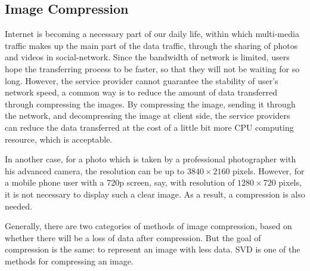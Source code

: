 \documentclass{article}
\begin{document}
        \subsection{Image Compression}
            \par
            Internet is becoming a necessary part of our daily life,
            within which multi-media traffic
            makes up the main part of the data traffic,
            through the sharing of photos and videos in social-network.
            Since the bandwidth of network is limited,
            users hope the transferring process to be faster,
            so that they will not be waiting for so long.
            However, the service provider cannot guarantee the stability
            of user’s network speed,
            a common way is to reduce the amount of data
            transferred through compressing the images.
            By compressing the image, sending it through the network,
            and decompressing the image at client side,
            the service providers can reduce the data transferred
            at the cost of a little bit more CPU computing resource,
            which is acceptable.
            \par
            In another case,
            for a photo which is taken by a professional photographer
            with his advanced camera,
            the resolution can be up to $3840\times2160$ pixels.
            However, for a mobile phone user with a 720p screen,
            say, with resolution of $1280\times720$ pixels,
            it is not necessary to display such a clear image.
            As a result, a compression is also needed.
            \par
            Generally, there are two categories of methods
            of image compression,
            based on whether there will be a loss of data after compression.
            But the goal of compression is the same:
            to represent an image with less data.
            SVD is one of the methods for compressing an image.
\end{document}
